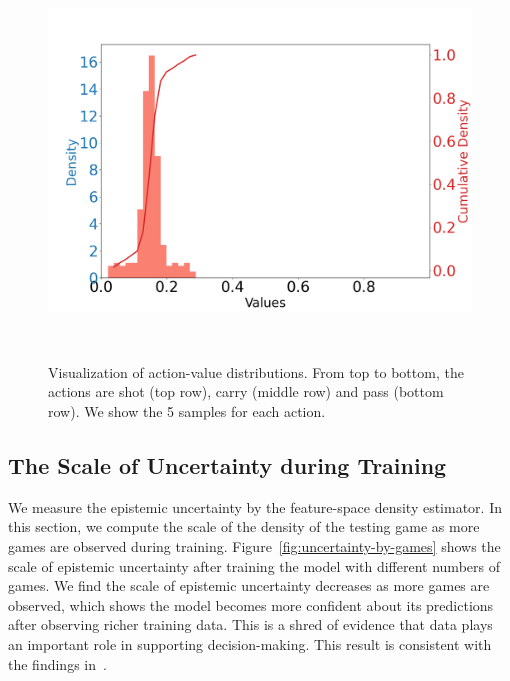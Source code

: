 \documentclass{article}
\begin{document}
\begin{figure}[htbp]
\begin{minipage}{0.195\textwidth}
    \includegraphics[scale=0.08]{figures/pass_density_idx_255_XCoord:-96.37_YCoord:-6.29.png}
    \end{minipage}
    \caption{Visualization of action-value distributions. From top to bottom, the actions are shot (top row), carry (middle row) and pass (bottom row). We show the 5 samples for each action.}~\label{fig:predicted-distribution-ice-hockey}
\end{figure}

\subsection{The Scale of Uncertainty during Training}

We measure the epistemic uncertainty by the feature-space density estimator. In this section, we compute the scale of the density of the testing game as more games are observed during training. Figure~\ref{fig:uncertainty-by-games} shows the scale of epistemic uncertainty after training the model with different numbers of games. We find the scale of epistemic uncertainty decreases as more games are observed, which shows the model becomes more confident about its predictions after observing richer training data. This is a shred of evidence that data plays an important role in supporting decision-making. This result is consistent with the findings in~\cite{Mavrin2019DistributionalRL}.
\end{document}
